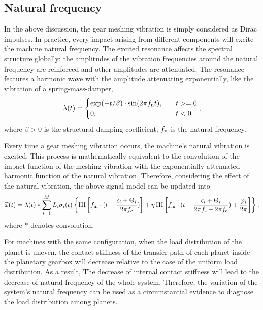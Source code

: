 \documentclass[a4paper,fleqn]{cas-sc}%
\begin{document}
\subsection{Natural frequency\label{sec:natural_frequency}}
\par In the above discussion, the gear meshing vibration is simply considered as Dirac impulses. In practice, every impact arising from different components will excite the machine natural frequency. The excited resonance affects the spectral structure globally: the amplitudes of the vibration frequencies around the natural frequency are reinforced and other amplitudes are attenuated. The resonance features a harmonic wave with the amplitude attenuating exponentially, like the vibration of a spring-mass-damper,
\begin{equation}
    \lambda(t)=\begin{cases}
        \exp(-t/\beta)\cdot \sin(2 \pi f_{\rm n} t),\quad & t>=0\\
        0, & t<0
    \end{cases},
\end{equation}
where $\beta>0$ is the structural damping coefficient, $f_{\rm n}$ is the natural frequency.
\par Every time a gear meshing vibration occurs, the machine's natural vibration is excited. This process is mathematically equivalent to the convolution of the impact function of the meshing vibration with the exponentially attenuated harmonic function of the natural vibration. Therefore, considering the effect of the natural vibration, the above signal model can be updated into
\begin{equation}
    \widetilde{x} (t)=\lambda(t) \ast \sum_{i=1}^{M} L_i \sigma_i(t) \left\{ \operatorname{III}\left[f_{\rm m} \cdot (t-\frac{\epsilon_i+\Theta_i}{2 \pi f_{\rm c}})\right]%
    + \eta \operatorname{III}\left[f_{\rm m} \cdot (t + \frac{\epsilon_i+\Theta_i}{2 \pi f_{\rm s}-2 \pi f_{\rm c}}) + \frac{\varphi_i}{2 \pi} \right]%
    \right\},\label{eq:final_signal_model}
\end{equation}
where $\ast$ denotes convolution.
\par For machines with the same configuration, when the load distribution of the planet is uneven, the contact stiffness of the transfer path of each planet inside the planetary gearbox will decrease relative to the case of the uniform load distribution. As a result, The decrease of internal contact stiffness will lead to the decrease of natural frequency of the whole system. Therefore, the variation of the system's natural frequency can be used as a circumstantial evidence to diagnose the load distribution among planets.
\end{document}
